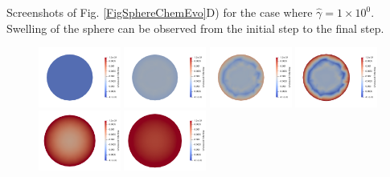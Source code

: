 \documentclass[12pt,3p]{article}
\numberwithin{equation}{section}
\begin{document}
Screenshots of Fig. \ref{FigSphereChemEvo}D) for the case where $\hat{\gamma} = 1 \times 10^{0}$. Swelling of the sphere can be observed from the initial step to the final step. 

\begin{figure}[!htb]
\centering
\includegraphics[width=0.24\textwidth]{../Results/Sphere/S_140_chi_3.0e-01_G_1e+00_l0_2.0e+00/Images/ChemicalPotential/ChemPot_000}
\includegraphics[width=0.24\textwidth]{../Results/Sphere/S_140_chi_3.0e-01_G_1e+00_l0_2.0e+00/Images/ChemicalPotential/ChemPot_059}
\includegraphics[width=0.24\textwidth]{../Results/Sphere/S_140_chi_3.0e-01_G_1e+00_l0_2.0e+00/Images/ChemicalPotential/ChemPot_079}
\includegraphics[width=0.24\textwidth]{../Results/Sphere/S_140_chi_3.0e-01_G_1e+00_l0_2.0e+00/Images/ChemicalPotential/ChemPot_089}
\includegraphics[width=0.24\textwidth]{../Results/Sphere/S_140_chi_3.0e-01_G_1e+00_l0_2.0e+00/Images/ChemicalPotential/ChemPot_099}
\includegraphics[width=0.24\textwidth]{../Results/Sphere/S_140_chi_3.0e-01_G_1e+00_l0_2.0e+00/Images/ChemicalPotential/ChemPot_103}

\end{figure}
\end{document}
